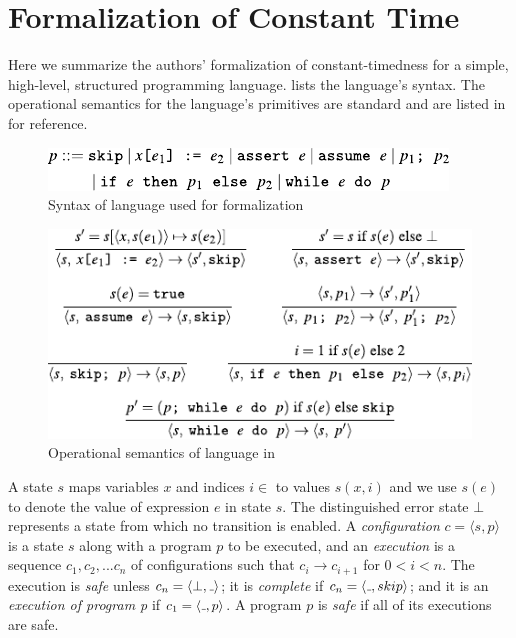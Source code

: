 \section{Formalization of Constant Time}
\label{sec:prelimnaries}


Here we summarize the authors' formalization of constant-timedness for a simple, high-level, structured programming language. 
 lists the language's syntax. 
The operational semantics for the language's primitives are standard and are listed in  for reference.

\begin{figure}[h!]
  \includegraphics[width=\columnwidth]{figs/fig_5.pdf}
  \caption{Syntax of language used for formalization}
  \label{fig:syntax}
\end{figure}

\begin{figure}[h!]
  \includegraphics[width=\columnwidth]{figs/fig_6.pdf}
  \caption{Operational semantics of language in }
  \label{fig:semantics}
\end{figure}

A state $s$ maps variables $x$ and indices $i \in $ to values $s(x,i)$ and we use $s(e)$ to denote the value of expression $e$ in state $s$. 
The distinguished error state $\bot$ represents a state from which no transition is enabled. A \emph{configuration} $c = \langle s,p \rangle$ is a state $s$ along with a program $p$ to be executed, and an \emph{execution} is a sequence $c_{1},c_{2},...c_{n}$ of configurations such that  $c_{i} \to c_{i+1}$ for $0<i<n$. The execution is \emph{safe} unless $c_{n} = \langle\bot,\mathunderscore\rangle$; it is \emph{complete} if $c_{n} = \langle\mathunderscore,skip\rangle$; and it is an \emph{execution of program p} if $c_{1} = \langle\mathunderscore,p\rangle$. A program $p$ is \emph{safe} if all of its executions are safe. 

